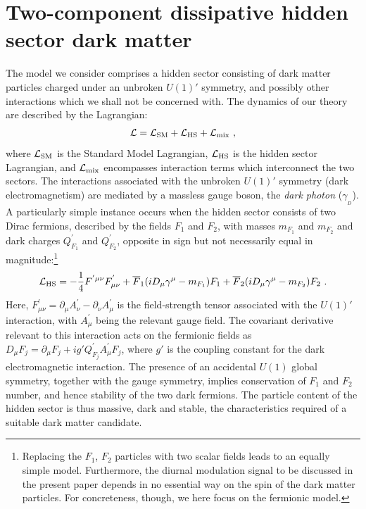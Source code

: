 \documentclass[12pt]{article}
\begin{document}
\section{Two-component dissipative hidden sector dark matter}

The model we consider comprises a hidden sector consisting of dark matter particles charged under an unbroken $U(1)'$ symmetry, and possibly other interactions which we shall not be concerned with. The dynamics of our theory are described by the Lagrangian:
%
\begin{eqnarray}
{\cal L} = {\cal L} _{\text{SM}} + {\cal L} _{\text{HS}} + {\cal L} _{\text{mix}} \ ,
\end{eqnarray}
%
where ${\cal L} _{\text{SM}}$ is the Standard Model Lagrangian, ${\cal L} _{\text{HS}}$ is the hidden sector Lagrangian, and ${\cal L} _{\text{mix}}$ encompasses interaction terms which interconnect the two sectors. The interactions associated with the unbroken $U(1)'$ symmetry (dark electromagnetism) are mediated by a massless gauge boson, the \textit{dark photon} ($\gamma _{_D}$). A particularly simple instance occurs when the hidden sector consists of two Dirac fermions, described by the fields $F_1$ and $F_2$, with masses $m _{F_1}$ and $m _{F_2}$ and dark charges $Q _{F_1} ^{'}$ and $Q _{F_2} ^{'}$, opposite in sign but not necessarily equal in magnitude:\footnote{Replacing the $F_1$, $F_2$ particles with two scalar fields leads to an equally simple model. Furthermore, the diurnal modulation signal to be discussed in the present paper depends in no essential way on the spin of the dark matter particles. For concreteness, though, we here focus on the fermionic model.}
%
\begin{eqnarray}
{\cal L} _{\text{HS}} = -\frac{1}{4}F ^{'\mu \nu}F ^{'} _{\mu \nu} + \overline{F}_1(iD _{\mu}\gamma ^{\mu} - m _{F_1})F_1 + \overline{F}_2(iD _{\mu}\gamma ^{\mu} - m _{F_2})F_2 \ .
\end{eqnarray}
%
Here, $F ^{'} _{\mu \nu} = \partial _{\mu}A ^{'} _{\nu} - \partial _{\nu}A ^{'} _{\mu}$ is the field-strength tensor associated with the $U(1)'$ interaction, with $A ^{'} _{\mu}$ being the relevant gauge field. The covariant derivative relevant to this interaction acts on the fermionic fields as $D _{\mu}F _j = \partial _{\mu}F _j + ig'Q ^{'} _{F_j}A ^{'} _{\mu}F _j$, where $g'$ is the coupling constant for the dark electromagnetic interaction. The presence of an accidental $U(1)$ global symmetry, together with the gauge symmetry, implies conservation of $F_1$ and $F_2$ number, and hence stability of the two dark fermions. The particle content of the hidden sector is thus massive, dark and stable, the characteristics required of a suitable dark matter candidate.
\end{document}
